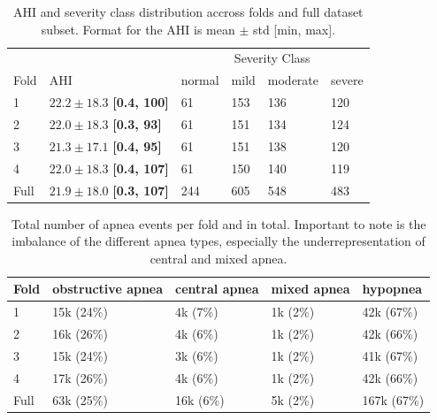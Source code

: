 \renewcommand{\arraystretch}{1.5}
\begin{table}
    \centering
    \begin{tabular}{p{1cm} p{2cm} p{1.5cm} p{1.5cm} p{1.5cm} p{1.5cm}}
         &  & \multicolumn{4}{c}{Severity Class} \\
        \cline{3-6}
        Fold & AHI & normal & mild & moderate & severe \\
        \hline
        1 & $22.2\pm18.3$ \newline \textbf{[0.4, 100]} & 61 & 153 & 136 & 120 \\
        2 & $22.0\pm18.3$ \newline \textbf{[0.3, 93]} & 61 & 151 & 134 & 124 \\
        3 & $21.3\pm17.1$ \newline \textbf{[0.4, 95]} & 61 & 151 & 138 & 120 \\
        4 & $22.0\pm18.3$ \newline \textbf{[0.4, 107]} & 61 & 150 & 140 & 119 \\
        \hline
        Full & $21.9\pm18.0$ \newline \textbf{[0.3, 107]} & 244 & 605 & 548 & 483 \\
    \end{tabular}
    \caption{AHI and severity class distribution accross folds and full dataset subset. Format for the AHI is mean $\pm$ std [min, max]. \label{tab:dataset-ahi}}
\end{table}

\renewcommand{\arraystretch}{1.5}
\begin{table}
    \centering
    \begin{tabular}{p{1cm} p{1.7cm} p{1.7cm} p{1.7cm} p{1.8cm}}
        Fold & obstructive \newline apnea & central \newline apnea & mixed \newline apnea & hypopnea \\
        \hline
        1 & 15k (24\%) & 4k (7\%) & 1k (2\%) & 42k (67\%) \\
        2 & 16k (26\%) & 4k (6\%) & 1k (2\%) & 42k (66\%) \\
        3 & 15k (24\%) & 3k (6\%) & 1k (2\%) & 41k (67\%) \\
        4 & 17k (26\%) & 4k (6\%) & 1k (2\%) & 42k (66\%) \\
        \hline
        Full & 63k (25\%) & 16k (6\%) & 5k (2\%) & 167k (67\%) \\
    \end{tabular}
    \caption{Total number of apnea events per fold and in total. Important to note is the imbalance of the different apnea types, especially the underrepresentation of central and mixed apnea. \label{tab:dataset-apnea-classes}}
\end{table}

